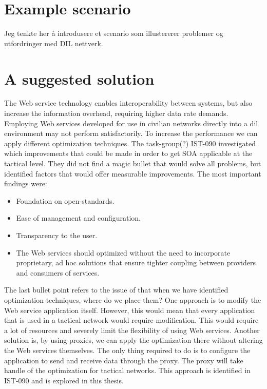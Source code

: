 \section{Example scenario}

Jeg tenkte her å introdusere et scenario som illustererer problemer og utfordringer
med DIL nettverk.


\section{A suggested solution}

The Web service technology enables interoperability between systems, but also
increase the information overhead, requiring higher data rate demands. Employing
Web services developed for use in civilian networks directly into a \gls{dil}
environment may not perform satisfactorily. To increase the performance we can
apply different optimization techniques. The task-group(?) IST-090\cite{ist-090}
investigated which improvements that could be made in order to get SOA
applicable at the tactical level. They did not find a magic bullet that would
solve all problems, but identified factors that would offer measurable
improvements. The most important findings were:

\begin{itemize}
    \item Foundation on open-standards.
    \item Ease of management and configuration.
    \item Transparency to the user.
    \item The Web services should optimized without the need to incorporate proprietary, ad hoc solutions that ensure tighter coupling between providers and consumers of services.
\end{itemize}

The last bullet point refers to the issue of that when we have identified
optimization techniques, where do we place them? One approach is to modify the
Web service application itself. However, this would mean that every application
that is used in a tactical network would require modification. This would
require a lot of resources and severely limit the flexibility of using Web
services. Another solution is, by using proxies, we can apply the optimization
there without altering the Web services themselves. The only thing required to
do is to configure the application to send and receive data through the proxy.
The proxy will take handle of the optimization for tactical networks. This
approach is identified in IST-090 and  is explored in this thesis.

